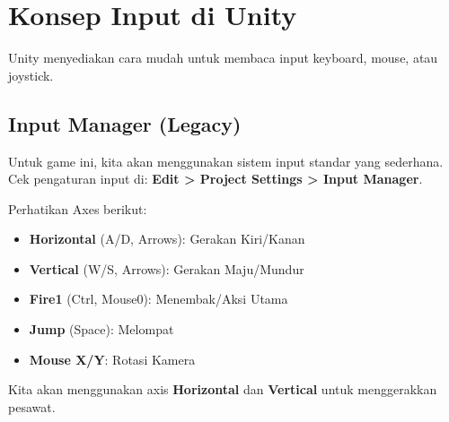 
\section{Konsep Input di Unity}

Unity menyediakan cara mudah untuk membaca input keyboard, mouse, atau joystick.

\subsection{Input Manager (Legacy)}

Untuk game ini, kita akan menggunakan sistem input standar yang sederhana.
Cek pengaturan input di: \textbf{Edit > Project Settings > Input Manager}.

Perhatikan Axes berikut:
\begin{itemize}
    \item \textbf{Horizontal} (A/D, Arrows): Gerakan Kiri/Kanan
    \item \textbf{Vertical} (W/S, Arrows): Gerakan Maju/Mundur
    \item \textbf{Fire1} (Ctrl, Mouse0): Menembak/Aksi Utama
    \item \textbf{Jump} (Space): Melompat
    \item \textbf{Mouse X/Y}: Rotasi Kamera
\end{itemize}

Kita akan menggunakan axis \textbf{Horizontal} dan \textbf{Vertical} untuk menggerakkan pesawat.
